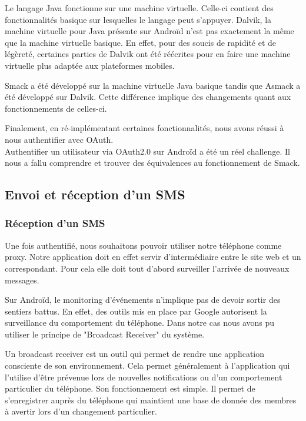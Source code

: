 Le langage Java fonctionne sur une machine virtuelle. Celle-ci contient des fonctionnalités basique sur
lesquelles le langage peut s'appuyer. Dalvik, la machine virtuelle pour Java présente sur Androïd n'est 
pas exactement la même que la machine virtuelle basique. En effet, pour des soucis de rapidité et de 
légèreté, certaines parties de Dalvik ont été réécrites pour en faire une machine virtuelle plus adaptée
aux plateformes mobiles.
 
Smack a été développé sur la machine virtuelle Java basique tandis que Asmack a été développé sur Dalvik.
Cette différence implique des changements quant aux fonctionnements de celles-ci. 
 
Finalement, en ré-implémentant certaines fonctionnalités, nous avons réussi à nous authentifier avec OAuth.
\\


Authentifier un utilisateur via OAuth2.0 sur Androïd a été un réel challenge. Il nous a fallu comprendre 
et trouver des équivalences au fonctionnement de Smack. 
\\
 
 
 
\subsection{Envoi et réception d'un SMS}
 
\subsubsection{Réception d'un SMS}
 
Une fois authentifié, nous souhaitons pouvoir utiliser notre téléphone comme proxy. Notre application
doit en effet servir d'intermédiaire entre le site web et un correspondant. Pour cela elle doit tout
d'abord surveiller l'arrivée de nouveaux messages. 
 
Sur Androïd, le monitoring d'événements n'implique pas de devoir sortir des sentiers battus. En effet,
des outils mis en place par Google autorisent la surveillance du comportement du téléphone. Dans notre cas 
nous avons pu utiliser le principe de "Broadcast Receiver" du système. 
 
Un broadcast receiver est un outil qui permet de rendre une application consciente de son environnement.
Cela permet généralement à l'application qui l'utilise d’être prévenue lors de nouvelles notifications ou 
d'un comportement particulier du téléphone.
Son fonctionnement est simple. Il permet de s'enregistrer auprès du téléphone qui maintient une base de donnée des 
membres à avertir lors d'un changement particulier.
 
